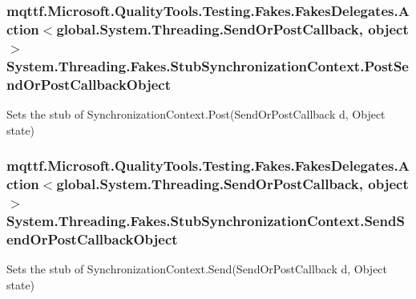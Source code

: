 \hypertarget{class_system_1_1_threading_1_1_fakes_1_1_stub_synchronization_context_a12a3114b6840566e9c49db563f0a2a56}{
\subsubsection[{Post\-Send\-Or\-Post\-Callback\-Object}]{\setlength{\rightskip}{0pt plus 5cm}mqttf.\-Microsoft.\-Quality\-Tools.\-Testing.\-Fakes.\-Fakes\-Delegates.\-Action$<$global.\-System.\-Threading.\-Send\-Or\-Post\-Callback, object$>$ System.\-Threading.\-Fakes.\-Stub\-Synchronization\-Context.\-Post\-Send\-Or\-Post\-Callback\-Object}}\label{class_system_1_1_threading_1_1_fakes_1_1_stub_synchronization_context_a12a3114b6840566e9c49db563f0a2a56}


Sets the stub of Synchronization\-Context.\-Post(\-Send\-Or\-Post\-Callback d, Object state)

\hypertarget{class_system_1_1_threading_1_1_fakes_1_1_stub_synchronization_context_a4af5bfcf1912c7cc7daee033c2f541ae}{
\subsubsection[{Send\-Send\-Or\-Post\-Callback\-Object}]{\setlength{\rightskip}{0pt plus 5cm}mqttf.\-Microsoft.\-Quality\-Tools.\-Testing.\-Fakes.\-Fakes\-Delegates.\-Action$<$global.\-System.\-Threading.\-Send\-Or\-Post\-Callback, object$>$ System.\-Threading.\-Fakes.\-Stub\-Synchronization\-Context.\-Send\-Send\-Or\-Post\-Callback\-Object}}\label{class_system_1_1_threading_1_1_fakes_1_1_stub_synchronization_context_a4af5bfcf1912c7cc7daee033c2f541ae}


Sets the stub of Synchronization\-Context.\-Send(\-Send\-Or\-Post\-Callback d, Object state)

